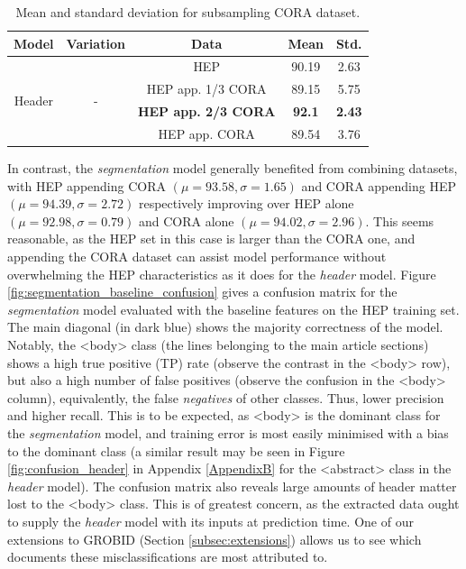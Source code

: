 \begin{table}[t]
\begin{center}
\begin{tabular}{|c|c|c|c|c|}
\hline
Model & Variation & Data & Mean & Std.\\
\hline
\multirow{4}{*}{Header} & \multirow{4}{*}{-} & HEP & 90.19 & 2.63\\\cline{3-5}
& & HEP app. 1/3 CORA & 89.15 & 5.75\\\cline{3-5}
& & \textbf{HEP app. 2/3 CORA} & \textbf{92.1} & \textbf{2.43}\\\cline{3-5}
& & HEP app. CORA & 89.54 & 3.76\\\cline{3-5}
\hline
\end{tabular}
\caption{Mean and standard deviation for subsampling CORA dataset.}
\label{table:subsampling}
\end{center}
\end{table}

In contrast, the \emph{segmentation} model generally benefited from combining datasets, with HEP appending CORA $(\mu = 93.58, \sigma = 1.65)$ and CORA appending HEP $(\mu = 94.39, \sigma = 2.72)$ respectively improving over HEP alone $(\mu = 92.98, \sigma = 0.79)$ and CORA alone $(\mu = 94.02, \sigma = 2.96)$. This seems reasonable, as the HEP set in this case is larger than the CORA one, and appending the CORA dataset can assist model performance without overwhelming the HEP characteristics as it does for the \emph{header} model. Figure \ref{fig:segmentation_baseline_confusion} gives a confusion matrix for the \emph{segmentation} model evaluated with the baseline features on the HEP training set. The main diagonal (in dark blue) shows the majority correctness of the model. Notably, the <body> class (the lines belonging to the main article sections) shows a high true positive (TP) rate (observe the contrast in the <body> row), but also a high number of false positives (observe the confusion in the <body> column), equivalently, the false \emph{negatives} of other classes. Thus, lower precision and higher recall. This is to be expected, as <body> is the dominant class for the \emph{segmentation} model, and training error is most easily minimised with a bias to the dominant class (a similar result may be seen in Figure \ref{fig:confusion_header} in Appendix \ref{AppendixB} for the <abstract> class in the \emph{header} model). The confusion matrix also reveals large amounts of header matter lost to the <body> class. This is of greatest concern, as the extracted data ought to supply the \emph{header} model with its inputs at prediction time. One of our extensions to GROBID (Section \ref{subsec:extensions}) allows us to see which documents these misclassifications are most attributed to.

